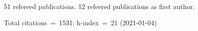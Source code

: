 51 refereed publications. 12 refeered publications as first author.

Total citations~=~1531; h-index~=~21 (2021-01-04)
